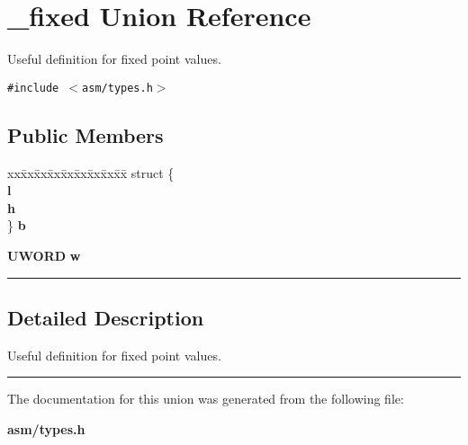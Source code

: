 \section{\_\-fixed  Union Reference}
\label{_fixed}
Useful definition for fixed point values. 


{\tt \#include $<$asm/types.h$>$}

\subsection*{Public Members}
\begin{CompactItemize}
\item 
\begin{tabbing}
xx\=xx\=xx\=xx\=xx\=xx\=xx\=xx\=xx\=\kill
\label{_fixed_a2}
struct \{\\
 {\bf l}\\
 {\bf h}\\
\} {\bf b}
\end{tabbing}
\item 
\label{_fixed_a3}
{\bf UWORD} {\bf w}
\end{CompactItemize}
\vspace{0.4cm}\hrule\vspace{0.2cm}
\subsection*{Detailed Description}
Useful definition for fixed point values.

\vspace{0.4cm}\hrule\vspace{0.2cm}
The documentation for this union was generated from the following file:\begin{CompactItemize}
\item 
{\bf asm/types.h}\end{CompactItemize}

